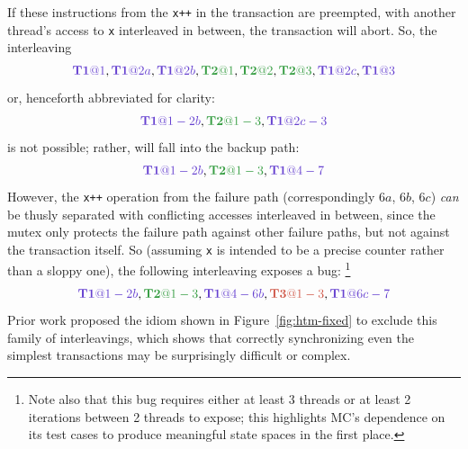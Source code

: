 \newcommand\tiat[1]{\ensuremath{\hilight{lavender}{\mathbf{T1}@#1}}\xspace}
\newcommand\tjat[1]{\ensuremath{\hilight{seafoam}{\mathbf{T2}@#1}}\xspace}
\newcommand\tkat[1]{\ensuremath{\hilight{salmon}{\mathbf{T3}@#1}}\xspace}

If these instructions from the {\tt x++} in the transaction are preempted,
with another thread's access to {\tt x} interleaved in between,
the transaction will abort.
So, the interleaving
\[
	\tiat{1}, \tiat{2a}, \tiat{2b}, \tjat{1}, \tjat{2}, \tjat{3}, \tiat{2c}, \tiat{3}
\]
or, henceforth abbreviated for clarity:
\[
	\tiat{1-2b}, \tjat{1-3}, \tiat{2c-3}
\]
is not possible; rather, \ti will fall into the backup path:
\[
	\tiat{1-2b}, \tjat{1-3}, \tiat{4-7}
\]
However, the {\tt x++} operation from the failure path (correspondingly $6a$, $6b$, $6c$)
{\em can} be thusly separated with conflicting accesses interleaved in between,
since the mutex only protects the failure path against other failure paths,
but not against the transaction itself.
So (assuming {\tt x} is intended to be a precise counter rather than a sloppy one),
the following interleaving exposes a bug:%
\footnote{Note also that this bug requires either at least 3 threads or at least 2 iterations between 2 threads to expose;
this highlights MC's dependence on its test cases to produce meaningful state spaces in the first place.}
\[
	\tiat{1-2b}, \tjat{1-3}, \tiat{4-6b}, \tkat{1-3}, \tiat{6c-7}
\]
Prior work \cite{tm-benchmark-cmu} proposed the idiom shown in Figure~\ref{fig:htm-fixed}
to exclude this family of interleavings,
which shows that correctly synchronizing even the simplest transactions may be surprisingly difficult or complex.

